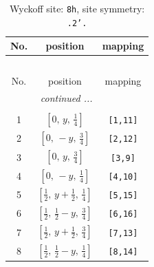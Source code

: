\documentclass[fleqn,8pt]{jsarticle}
\begin{document}
\begin{longtable}{ccc}
\caption{Wyckoff site: {\tt 8h}, site symmetry: {\tt .2'.}}
 \\
 \hline \hline
No. & position & mapping \\ \hline \endfirsthead

\multicolumn{2}{l}{\tablename\ \thetable{}} \\
 \hline \hline
No. & position & mapping \\ \hline \endhead

 \hline \hline
\multicolumn{2}{r}{\footnotesize\it continued ...} \\ \endfoot

 \hline \hline
\multicolumn{2}{r}{} \\ \endlastfoot

1 & $\left[ 0,\, y,\, \frac{1}{4} \right]$ & {\tt [1,11]} \\ \hline
2 & $\left[ 0,\, - y,\, \frac{3}{4} \right]$ & {\tt [2,12]} \\ \hline
3 & $\left[ 0,\, y,\, \frac{3}{4} \right]$ & {\tt [3,9]} \\ \hline
4 & $\left[ 0,\, - y,\, \frac{1}{4} \right]$ & {\tt [4,10]} \\ \hline
5 & $\left[ \frac{1}{2},\, y + \frac{1}{2},\, \frac{1}{4} \right]$ & {\tt [5,15]} \\ \hline
6 & $\left[ \frac{1}{2},\, \frac{1}{2} - y,\, \frac{3}{4} \right]$ & {\tt [6,16]} \\ \hline
7 & $\left[ \frac{1}{2},\, y + \frac{1}{2},\, \frac{3}{4} \right]$ & {\tt [7,13]} \\ \hline
8 & $\left[ \frac{1}{2},\, \frac{1}{2} - y,\, \frac{1}{4} \right]$ & {\tt [8,14]} \\
\end{longtable}
\renewcommand{\arraystretch}{1.2}
\end{document}
